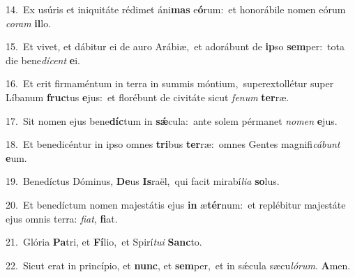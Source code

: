 {\numbfont\textcolor{\numbcolor}{14.}}~Ex usúris et iniquitáte rédimet áni\textbf{mas} e\-\textbf{ó}\-rum:~\star et honorábile nomen eórum \textit{co}\-\textit{ram} \textbf{il}\-lo.\par
{\numbfont\textcolor{\numbcolor}{15.}}~Et vivet, et dábitur ei de auro Arábiæ,~\dagger et adorábunt de \textbf{ip}\-so \textbf{sem}\-per:~\star tota die bene\-\textit{dí}\-\textit{cent} \textbf{e}\-i.\par
{\numbfont\textcolor{\numbcolor}{16.}}~Et erit firmaméntum in terra in summis móntium,~\dagger superextollétur super Líbanum \textbf{fruc}\-tus \textbf{e}\-jus:~\star et florébunt de civitáte sicut \textit{fe}\-\textit{num} \textbf{ter}\-ræ.\par
{\numbfont\textcolor{\numbcolor}{17.}}~Sit nomen ejus bene\-\textbf{díc}\-tum in \textbf{sǽ}\-cula:~\star ante solem pérmanet \textit{no}\-\textit{men} \textbf{e}\-jus.\par
{\numbfont\textcolor{\numbcolor}{18.}}~Et benedicéntur in ipso omnes \textbf{tri}\-bus \textbf{ter}\-ræ:~\star omnes Gentes magnifi\-\textit{cá}\-\textit{bunt} \textbf{e}\-um.\par
{\numbfont\textcolor{\numbcolor}{19.}}~Benedíctus Dóminus, \textbf{De}\-us \textbf{Is}\-raël,~\star qui facit mirabí\-\textit{li}\-\textit{a} \textbf{so}\-lus.\par
{\numbfont\textcolor{\numbcolor}{20.}}~Et benedíctum nomen majestátis ejus \textbf{in} æ\-\textbf{tér}\-num:~\star et replébitur majestáte ejus omnis terra: \textit{fi}\-\textit{at}, \textbf{fi}\-at.\par
{\numbfont\textcolor{\numbcolor}{21.}}~Glória \textbf{Pa}\-tri, et \textbf{Fí}\-lio,~\star et Spirí\-\textit{tu}\-\textit{i} \textbf{Sanc}\-to.\par
{\numbfont\textcolor{\numbcolor}{22.}}~Sicut erat in princípio, et \textbf{nunc}\-, et \textbf{sem}\-per,~\star et in sǽcula sæcu\-\textit{ló}\-\textit{rum}. \textbf{A}\-men.\par
